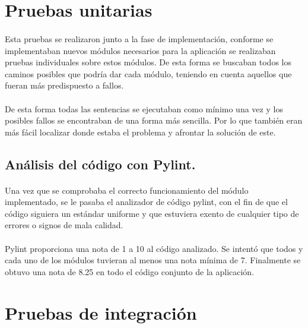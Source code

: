 \section{Pruebas unitarias}

\paragraph{}
Esta pruebas se realizaron junto a la fase de implementación, conforme se implementaban nuevos módulos necesarios para la aplicación
se realizaban pruebas individuales sobre estos módulos. De esta forma se buscaban todos los caminos posibles que podría dar cada 
módulo, teniendo en cuenta aquellos que fueran más predispuesto a fallos.

\paragraph{}
De esta forma todas las sentencias se ejecutaban como mínimo una vez y los posibles fallos se encontraban de una forma más sencilla.
Por lo que también eran más fácil localizar donde estaba el problema y afrontar la solución de este.

\subsection{Análisis del código con Pylint.}

\paragraph{}
Una vez que se comprobaba el correcto funcionamiento del módulo implementado, se le pasaba el analizador de código pylint, con el 
fin de que el código siguiera un estándar uniforme y que estuviera exento de cualquier tipo de errores o signos de mala calidad.

\paragraph{}
Pylint proporciona una nota de 1 a 10 al código analizado. Se intentó que todos y cada uno de los módulos tuvieran al menos
una nota mínima de 7. Finalmente se obtuvo una nota de 8.25 en todo el código conjunto de la aplicación.

\section{Pruebas de integración}


